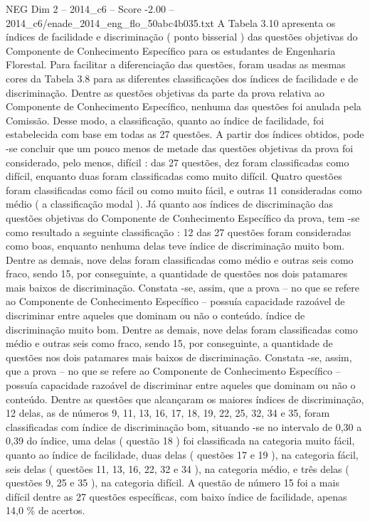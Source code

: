 \begin{textsample}{NEG Dim 2 – 2014\_c6 – Score -2.00 – 2014\_c6/enade\_2014\_eng\_flo\_50abc4b035.txt}
A Tabela 3.10 apresenta os índices de facilidade e discriminação ( ponto bisserial ) das questões objetivas do Componente de Conhecimento Específico para os estudantes de Engenharia Florestal.
Para facilitar a diferenciação das questões, foram usadas as mesmas cores da Tabela 3.8 para as diferentes classificações dos índices de facilidade e de discriminação.
Dentre as questões objetivas da parte da prova relativa ao Componente de Conhecimento Específico, nenhuma das questões foi anulada pela Comissão.
Desse modo, a classificação, quanto ao índice de facilidade, foi estabelecida com base em todas as 27 questões.
A partir dos índices obtidos, pode -se concluir que um pouco menos de metade das questões objetivas da prova foi considerado, pelo menos, difícil : das 27 questões, dez foram classificadas como difícil, enquanto duas foram classificadas como muito difícil.
Quatro questões foram classificadas como fácil ou como muito fácil, e outras 11 consideradas como médio ( a classificação modal ).
Já quanto aos índices de discriminação das questões objetivas do Componente de Conhecimento Específico da prova, tem -se como resultado a seguinte classificação : 12 das 27 questões foram consideradas como boas, enquanto nenhuma delas teve índice de discriminação muito bom.
Dentre as demais, nove delas foram classificadas como médio e outras seis como fraco, sendo 15, por conseguinte, a quantidade de questões nos dois patamares mais baixos de discriminação.
Constata -se, assim, que a prova – no que se refere ao Componente de Conhecimento Específico – possuía capacidade razoável de discriminar entre aqueles que dominam ou não o conteúdo. índice de discriminação muito bom.
Dentre as demais, nove delas foram classificadas como médio e outras seis como fraco, sendo 15, por conseguinte, a quantidade de questões nos dois patamares mais baixos de discriminação.
Constata -se, assim, que a prova – no que se refere ao Componente de Conhecimento Específico – possuía capacidade razoável de discriminar entre aqueles que dominam ou não o conteúdo.
Dentre as questões que alcançaram os maiores índices de discriminação, 12 delas, as de números 9, 11, 13, 16, 17, 18, 19, 22, 25, 32, 34 e 35, foram classificadas com índice de discriminação bom, situando -se no intervalo de 0,30 a 0,39 do índice, uma delas ( questão 18 ) foi classificada na categoria muito fácil, quanto ao índice de facilidade, duas delas ( questões 17 e 19 ), na categoria fácil, seis delas ( questões 11, 13, 16, 22, 32 e 34 ), na categoria médio, e três delas ( questões 9, 25 e 35 ), na categoria difícil.
A questão de número 15 foi a mais difícil dentre as 27 questões específicas, com baixo índice de facilidade, apenas 14,0 \% de acertos.

\end{textsample}

